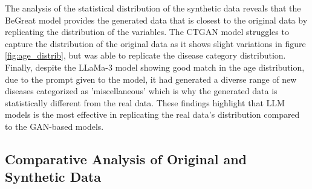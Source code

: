 The analysis of the statistical distribution of the synthetic data reveals that the BeGreat model provides the generated data that is closest to the original data by replicating the distribution of the variables. The CTGAN model struggles to capture the distribution of the original data as it shows slight variations in figure \ref{fig:age_distrib}, but was able to replicate the disease category distribution. Finally, despite the LLaMa-3 model showing good match in the age distribution, due to the prompt given to the model, it had generated a diverse range of new diseases categorized as 'miscellaneous' which is why the generated data is statistically different from the real data.
These findings highlight that LLM models is the most effective in replicating the real data's distribution compared to the GAN-based models.


\subsection{Comparative Analysis of Original and Synthetic Data}


